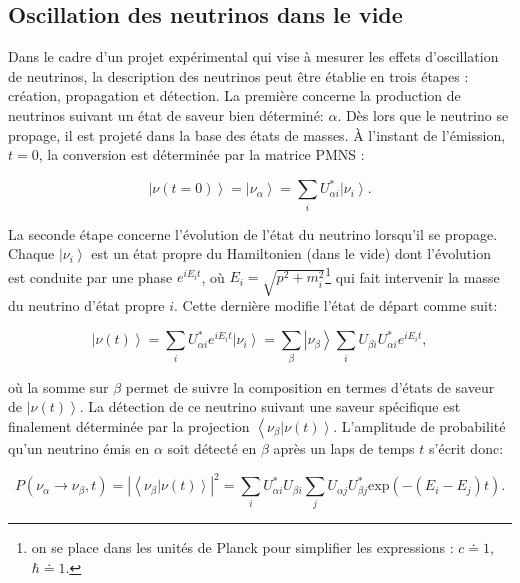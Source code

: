\bigbreak

\subsection{Oscillation des neutrinos dans le vide}

Dans le cadre d'un projet expérimental qui vise à mesurer les effets d'oscillation de neutrinos, la description des neutrinos peut être établie en trois étapes : création, propagation et détection. La première concerne la production de neutrinos suivant un état de saveur bien déterminé: $\alpha$. Dès lors que le neutrino se propage, il est projeté dans la base des états de masses. À l'instant de l'émission, $t = 0$, la conversion est déterminée par la matrice PMNS :

\begin{equation}
    \left|\nu(t = 0)\right> = \left|\nu_\alpha\right> = \sum_i U_{\alpha i}^* \left|\nu_i\right>.
\end{equation}

La seconde étape concerne l'évolution de l'état du neutrino lorsqu'il se propage. Chaque $\left|\nu_i\right>$ est un état propre du Hamiltonien (dans le vide) dont l'évolution est conduite par une phase $e^{iE_it}$, où $E_i = \sqrt{p^2 + m_i^2}$\footnote{on se place dans les unités de Planck pour simplifier les expressions : $c \doteq 1$, $\hbar \doteq 1$.} qui fait intervenir la masse du neutrino d'état propre $i$. Cette dernière modifie l'état de départ comme suit:

\begin{equation}
    \left|\nu(t)\right> = \sum_i U_{\alpha i}^* e^{iE_it} \left|\nu_i\right> = \sum_\beta \left|\nu_\beta\right> \sum_i U_{\beta i} U_{\alpha i}^* e^{iE_it},
\end{equation}

\bigbreak

où la somme sur $\beta$ permet de suivre la composition en termes d'états de saveur de $\left|\nu(t)\right>$. La détection de ce neutrino suivant une saveur spécifique est finalement déterminée par la projection $\left< \nu_\beta \right.\left|\nu(t)\right>$. L'amplitude de probabilité qu'un neutrino émis en $\alpha$ soit détecté en $\beta$ après un laps de temps $t$ s'écrit donc:

\begin{equation}
    P(\nu_\alpha \rightarrow \nu_\beta, t) = \left|\left< \nu_\beta \right.\left|\nu(t)\right>\right|^2 = \sum_i U_{\alpha i}^* U_{\beta i} \sum_j U_{\alpha j} U_{\beta j}^* \textrm{exp}\left(-(E_i - E_j)t\right).
\end{equation}

